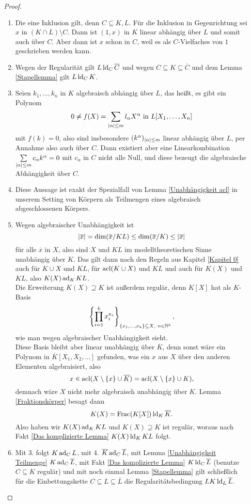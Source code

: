     \begin{proof}
    	\ 
    	\begin{enumerate}
    		\item Die eine Inklusion gilt, denn $C\subseteq K,L$. Für die Inklusion in Gegenrichtung sei $x$ in $(K\cap L)\setminus C$. Dann ist $(1,x)$ in $K$ linear abhängig über $L$ und somit auch über $C$. Aber dann ist $x$ schon in $C$, weil es als $C$-Vielfaches von $1$ geschrieben werden kann.
    		\item Wegen der Regularität gilt $L\operatorname{ld}_C\overline{C}$ und wegen $C\subseteq K\subseteq\overline{C}$ und dem Lemma \ref{Stapellemma} gilt $L\operatorname{ld}_C K$.
    		\item Seien $k_1,\dots,k_n$ in $K$ algebraisch abhängig über $L$, das heißt, es gibt ein Polynom $$0\neq f(X)=\sum\limits_{{\left| \alpha \right|}\leq m}l_\alpha X^\alpha\text{ in }L[X_1,\dots,X_n]$$ mit $f(k)=0$, also sind insbesondere $(k^\alpha)_{{\left| \alpha \right|}\leq m}$ linear abhängig über $L$, per Annahme also auch über $C$. Dann existiert aber eine Linearkombination $\sum\limits_{{\left| \alpha \right|}\leq m}c_\alpha k^\alpha=0$ mit $c_\alpha$ in $C$ nicht alle Null, und diese bezeugt die algebraische Abhängigkeit über $C$.
    		\item Diese Aussage ist exakt der Spezialfall von Lemma \ref{Unabhängigkeit acl} in unserem Setting von Körpern als Teilmengen eines algebraisch abgeschlossenen Körpers.
    		\item Wegen algebraischer Unabhängigkeit ist $${\left| \overline{x} \right|}=\dim(\overline{x}/KL)\leq\dim(\overline{x}/K)\leq{\left| \overline{x} \right|}$$ für alle $\overline{x}$ in $X$, also sind $X$ und $KL$ im modelltheoretischen Sinne unabhängig über $K$. Das gilt dann nach den Regeln aus Kapitel \ref{Kapitel 0} auch für $K\cup X$ und $KL$, für $\operatorname{acl}(K\cup X)$ und $KL$ und auch für $K(X)$ und $KL$, also $K(X)\operatorname{ad}_KKL$.\\
    		Die Erweiterung $K(X)\supseteq K$ ist außerdem regulär, denn $K[X]$ hat als $K$-Basis $$\left\{\prod\limits_{i=1}^kx_i^{n_i}\right\}_{\{x_1,\dots,x_k\}\subseteq X\text,\ n\in\mathbb{N}^k},$$ wie man wegen algebraischer Unabhängigkeit sieht.\\
    		Diese Basis bleibt aber linear unabhängig über $\overline{K}$, denn sonst wäre ein Polynom in $\overline{K}[X_1,X_2,\dots]$ gefunden, was ein $x$ aus $X$ über den anderen Elementen algebraisiert, also $$x\in\operatorname{acl}(X\setminus\{x\}\cup\overline{K})=\operatorname{acl}(X\setminus\{x\}\cup K),$$ demnach wäre $X$ nicht mehr algebraisch unabhängig über $K$. Lemma \ref{Fraktionskörper} besagt dann $$K(X)=\operatorname{Frac}(K[X])\operatorname{ld}_K\overline{K}.$$
    		Also haben wir $K(X)\operatorname{ad}_KKL$ und $K(X)\supseteq K$ ist regulär, woraus nach Fakt \ref{Das komplizierte Lemma} $K(X)\operatorname{ld}_KKL$ folgt.
    		\item Mit 3. folgt $K\operatorname{ad}_CL$, mit 4. $\overline{K}\operatorname{ad}_C\overline{L}$, mit Lemma \ref{Unabhängigkeit Teilmenge} $K\operatorname{ad}_C\overline{L}$, mit Fakt \ref{Das komplizierte Lemma} $K\operatorname{ld}_C\overline{L}$ (benutze $C\subseteq K$ regulär) und mit noch einmal Lemma \ref{Stapellemma} gilt schließlich für die Einbettungskette $C\subseteq L\subseteq\overline{L}$ die Regularitätsbedingung $LK\operatorname{ld}_L\overline{L}$.
    	\end{enumerate}
    \end{proof}
    
